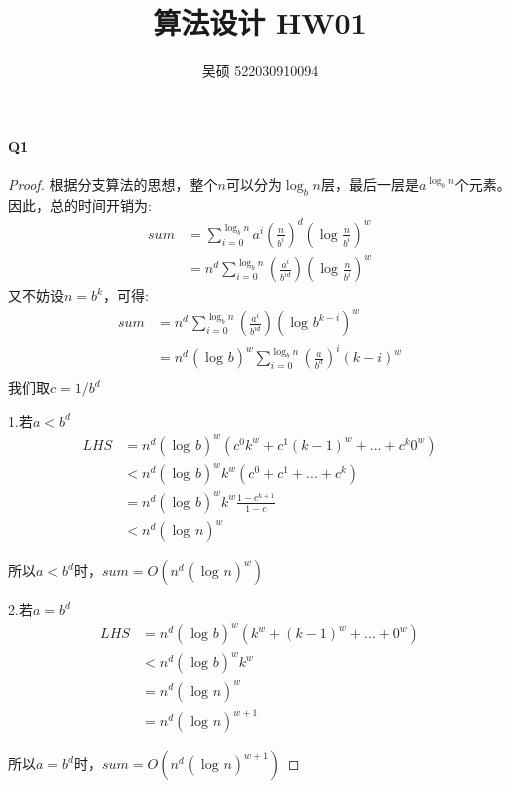 \documentclass[UTF8]{ctexart}
\renewcommand{\(}{\left(}
\renewcommand{\)}{\right)}
\begin{document}
\title{算法设计 HW01}  
\author{吴硕 522030910094}
\maketitle

\paragraph{Q1} 
\begin{proof}

根据分支算法的思想，整个$n$可以分为$\log_{b}{n}$层，最后一层是$a^{\log_{b}{n}}$个元素。
因此，总的时间开销为:
$$
\begin{aligned}
	sum&=\sum_{i=0}^{\log_{b}{n}} {a^{i}\(\frac{n}{b^{i}} \)^{d}\(\log_{}{\frac{n}{b^{i}}}\)^{w}}  \\
    &=n^{d}\sum_{i=0}^{\log_{b}{n}} {\(\frac{a^{i}}{{b^{id}}} \)}\(\log_{}{\frac{n}{b^{i}}}\)^{w} 
\end{aligned}
$$
又不妨设$n=b^{k}$，可得:
$$
\begin{aligned}
    sum&=n^{d}\sum_{i=0}^{\log_{b}{n}} {\(\frac{a^{i}}{{b^{id}}} \)}\(\log_{}{{b^{k-i}}}\)^{w} \\
    &=n^{d}\(\log_{}{b}\)^{w}\sum_{i=0}^{\log_{b}{n}} {\(\frac{a}{{b^{d}}} \)^{i}}\(k-i\)^{w}  \\
\end{aligned}
$$
我们取$c=1/b^{d}$

1.若$a<b^{d}$
$$
\begin{aligned}
    LHS &=n^{d}\(\log_{}{b}\)^{w}\(c^{0}k^{w}+c^{1}\(k-1\)^{w}+...+c^{k}0^{w}\)\\
 &<n^{d}\(\log_{}{b}\)^{w}k^{w}\(c^{0}+c^{1}+...+c^{k}\)\\                 
 &=n^{d}\(\log_{}{b}\)^{w}k^{w}\frac{1-c^{k+1}}{1-c}\\
&<n^{d}\(\log_{}{n}\)^{w}
\end{aligned}
$$

所以$a<b^{d}$时，$sum=O\(n^{d}\(\log_{}{n}\)^{w}\)$
    

2.若$a=b^{d}$
$$
\begin{aligned}
    LHS&=n^{d}\(\log_{}{b}\)^{w}\(k^{w}+\(k-1\)^{w}+...+0^{w}\) \\
&<n^{d}\(\log_{}{b}\)^{w}k^{w}\\
&=n^{d}\(\log_{}{n}\)^{w}\\
&=n^{d}\(\log_{}{n}\)^{w+1}
\end{aligned}
$$


所以$a=b^{d}$时，$sum=O\(n^{d}\(\log_{}{n}\)^{w+1}\)$


\end{proof}
\end{document}
